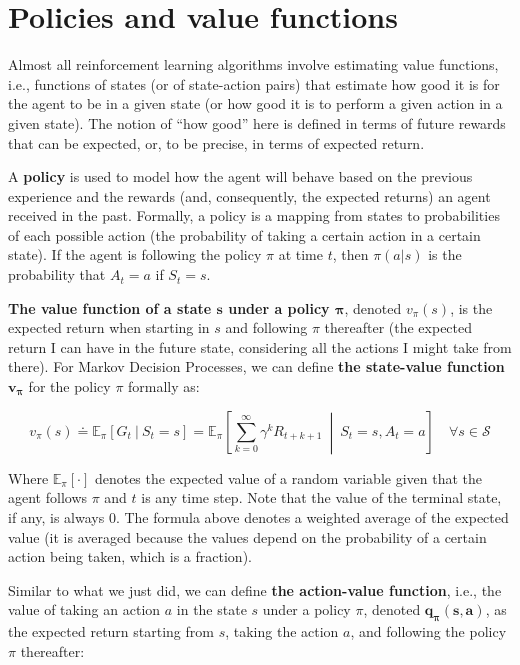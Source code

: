 \section{Policies and value functions}
Almost all reinforcement learning algorithms involve estimating value functions, i.e., functions of states (or of state-action pairs) that estimate how good it is for the agent to be in a given state (or how good it is to perform a given action in a given state). The notion of ``how good'' here is defined in terms of future rewards that can be expected, or, to be precise, in terms of expected return.

A \textbf{policy} is used to model how the agent will behave based on the previous experience and the rewards (and, consequently, the expected returns) an agent received in the past. Formally, a policy is a mapping from states to probabilities of each possible action (the probability of taking a certain action in a certain state). If the agent is following the policy $\pi$ at time $t$, then $\pi (a \vert s)$ is the probability that $A_t=a$ if $S_t=s$.

\textbf{The value function of a state $\boldsymbol{s}$ under a policy $\boldsymbol{\pi}$}, denoted $v_\pi (s)$, is the expected return when starting in $s$ and following $\pi$ thereafter (the expected return I can have in the future state, considering all the actions I might take from there). For Markov Decision Processes, we can define \textbf{the state-value function} $\boldsymbol{v_\pi}$ for the policy $\pi$ formally as:

\begin{equation}
    v_\pi(s) \doteq \mathbb{E}_\pi \left[ G_t  \ \vert \  S_t = s \right] = \mathbb{E}_\pi \left[ \sum_{k=0}^{\infty}  \gamma^k R_{t+k+1} \  \middle\vert \  S_t = s, A_t = a \right] \quad \forall s \in \mathcal{S}
    \label{eq:ch2-statevaluefunction}
\end{equation}

Where $\mathbb{E}_\pi [\cdot]$ denotes the expected value of a random variable given that the agent follows $\pi$ and $t$ is any time step. Note that the value of the terminal state, if any, is always $0$. The formula above denotes a weighted average of the expected value (it is averaged because the values depend on the probability of a certain action being taken, which is a fraction).

Similar to what we just did, we can define \textbf{the action-value function}, i.e., the value of taking an action $a$ in the state $s$ under a policy $\pi$, denoted $\boldsymbol{q_\pi (s,a)}$, as the expected return starting from $s$, taking the action $a$, and following the policy $\pi$ thereafter:

